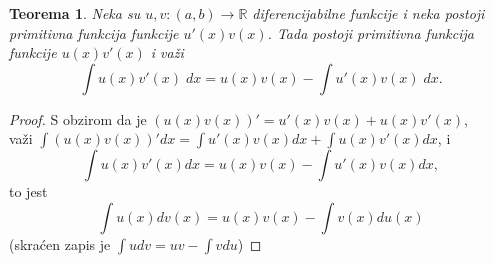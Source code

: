\documentclass[a4paper,12pt,twoside]{report}
\newtheorem{theorem}{Teorema}[section]
\numberwithin{algorithm}{section}
\begin{document}
\begin{theorem}
    Neka su $u, v:(a, b) \to \mathbb{R}$ diferencijabilne funkcije i neka postoji primitivna funkcija funkcije $u'(x)v(x)$. Tada
    postoji primitivna funkcija funkcije $u(x)v'(x)$ i važi
    \[ \int u(x) v'(x) \; dx = u(x)v(x) - \int u'(x) v(x) \;dx. \]
\end{theorem}

\begin{proof}
    S obzirom da je \((u(x)v(x))' = u'(x)v(x) + u(x)v'(x)\), \\
    važi \(\displaystyle \int (u(x)v(x))'dx = \int u'(x)v(x)dx + \int u(x)v'(x)dx\), i
    \[
        \int u(x)v'(x)dx = u(x)v(x) - \int u'(x)v(x)dx,
    \]
    to jest
    \[
        \int u(x)dv(x) = u(x)v(x) - \int v(x)du(x)
    \]
    (skraćen zapis je \(\int udv = uv - \int vdu\))
\end{proof}
\end{document}

